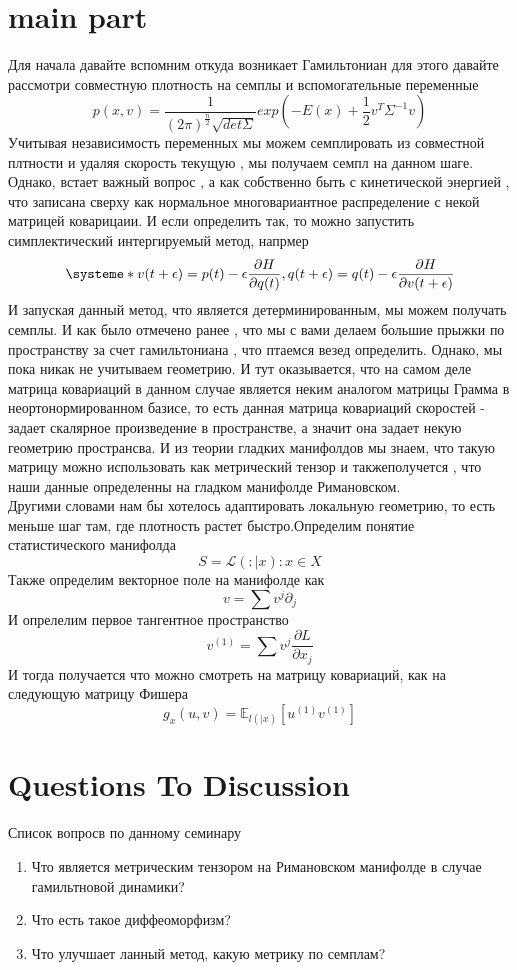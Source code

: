 \section{main part}
Для начала давайте вспомним откуда возникает Гамильтониан для этого давайте рассмотри совместную плотность на семплы и вспомогательные переменные
 $$ p(x,v) =  \frac{1}{(2\pi)^{\frac{n}{2}} \sqrt{det \Sigma}} exp(- E(x) + \frac{1}{2}v^{T}\Sigma^{-1} v)$$
 Учитывая независимость переменных мы можем семплировать из совместной плтности и удаляя скорость текущую , мы получаем семпл на данном шаге. Однако, встает важный вопрос , а как собственно быть с кинетической энергией , что записана сверху как нормальное многовариантное распределение с некой матрицей коварицаии. И если определить так, то можно запустить симплектический интергируемый метод, напрмер 
 \[
     \systeme*{v(t + \epsilon) = p(t) - \epsilon \frac{\partial H}{\partial q(t)},
       q(t + \epsilon) = q(t) - \epsilon \frac{\partial H}{\partial v(t +\epsilon)}}
\]
И запуская данный метод, что является детерминированным, мы можем получать семплы. И как было отмечено ранее , что мы с вами делаем большие прыжки по пространству за счет гамильтониана , что птаемся везед определить. Однако, мы пока никак не учитываем геометрию. И тут оказывается, что на самом деле матрица ковариаций в данном случае является неким аналогом матрицы Грамма в неортонормированном базисе, то есть данная матрица ковариаций скоростей - задает скалярное произведение в пространстве, а значит она задает некую геометрию пространсва. И из теории гладких манифолдов мы знаем, что такую матрицу можно использовать как метрический тензор и такжеполучется , что наши данные определенны на гладком манифолде Римановском.
\\[0.2 cm]
Другими словами нам бы хотелось адаптировать локальную геометрию, то есть меньше шаг там, где плотность растет быстро.Определим понятие статистического манифолда
$$ S = {\mathcal{L}( : |x) : x \in X} $$
Также определим векторное поле на манифолде как
$$ v = \sum v^{j} \partial_{j} $$
И опрелелим первое тангентное пространство
$$ v^{(1)}  = \sum v^{j} \frac{\partial L}{\partial x_{j}}$$
И тогда получается что можно смотреть на матрицу ковариаций, как на следующую матрицу Фишера
$$ g_{x}(u,v) = \mathbb{E}_{l(|x)}[u^{(1)}v^{(1)}] $$



\section{Questions To Discussion}
Список вопросв по данному семинару
\begin{enumerate}
    \item Что является метрическим тензором на Римановском манифолде в случае гамильтновой динамики?
    \item  Что есть такое диффеоморфизм?
    \item  Что улучшает ланный метод, какую метрику по семплам? 
\end{enumerate}

 

